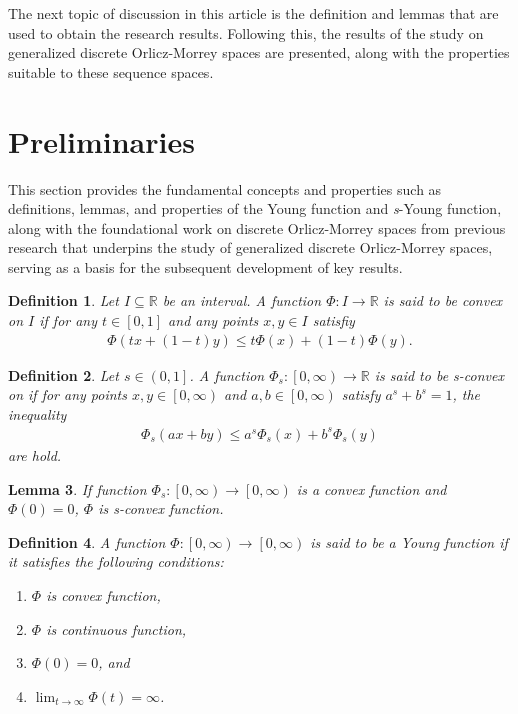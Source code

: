 \documentclass[12pt,a4paper]{article}
\newtheorem{definition}{Definition}[section]
\newtheorem{lemma}[definition]{Lemma}
\theoremstyle{remark}
\begin{document}
The next topic of discussion in this article is the definition and lemmas that are used to obtain the research results. Following this, the results of the study on generalized discrete Orlicz-Morrey spaces are presented, along with the properties suitable to these sequence spaces.

\section{Preliminaries}
This section provides the fundamental concepts and properties such as definitions, lemmas, and properties of the Young function and \emph{s}-Young function, along with the foundational work on discrete Orlicz-Morrey spaces from previous research that underpins the study of generalized discrete Orlicz-Morrey spaces, serving as a basis for the subsequent development of key results.

\begin{definition}
    \cite{ref9} Let $I \subseteq \mathbb{R}$ be an interval. A function $\Phi : I \rightarrow \mathbb{R}$ is said to be convex on $I$ if for any $t\in \left[0,1\right]$ and any points $x,y\in I$ satisfiy
    \begin{eqnarray*}
        \Phi\left(tx+\left(1-t\right)y\right) \leq t\Phi\left(x\right)+\left(1-t\right)\Phi\left(y\right).
    \end{eqnarray*}
\end{definition}

\begin{definition}
    \cite{ref8} Let $s\in\left(0,1\right]$. A function $\Phi_s : \left[0, \infty\right) \rightarrow \mathbb{R}$ is said to be \emph{s}-convex on if for any points $x,y\in \left[0, \infty\right)$ and $a,b\in\left[0, \infty\right)$ satisfy $a^{s}+b^{s}=1$, the inequality
    \begin{eqnarray*}
        \Phi_s \left(ax+by\right) \leq a^{s}\Phi_s\left(x\right)+b^{s}\Phi_s\left(y\right)
    \end{eqnarray*}
    are hold.
\end{definition}

\begin{lemma}
    \cite{ref10} If function $\Phi_s : \left[0, \infty\right) \rightarrow \left[0, \infty\right)$ is a convex function and $\Phi\left(0\right)=0$, $\Phi$ is \emph{s}-convex function.
\end{lemma}

\begin{definition}
    \cite{ref6} A function $\Phi : \left[0, \infty\right) \rightarrow \left[0, \infty\right)$ is said to be a Young function if it satisfies the following conditions:
    \begin{enumerate}
        \item[a)] $\Phi$ is convex function,
        \item[b)] $\Phi$ is continuous function,
        \item[c)] $\Phi\left(0\right) = 0$, and
        \item[d)] $\lim_{t\to \infty} \Phi \left(t\right)=\infty $.
    \end{enumerate}
\end{definition}
\end{document}
